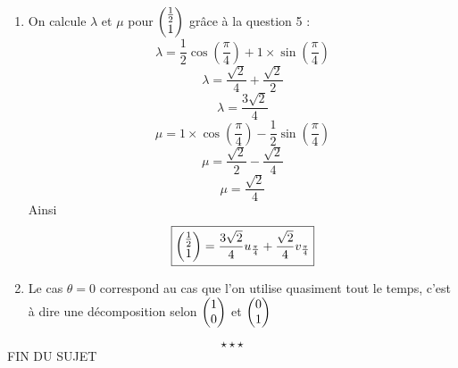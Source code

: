\begin{enumerate}
\item On calcule $\lambda$ et $\mu$ pour $\displaystyle \begin{pmatrix}\frac{1}{2} \\1 \end{pmatrix}$ grâce à la question 5 : 
$$\lambda = \frac{1}{2}\cos(\frac{\pi}{4}) + 1 \times \sin(\frac{\pi}{4})$$
$$\lambda = \frac{\sqrt{2}}{4} + \frac{\sqrt{2}}{2}$$
$$\boxed{\lambda = \frac{3\sqrt{2}}{4}}$$
$$\mu = 1\times \cos(\frac{\pi}{4}) - \frac{1}{2}\sin(\frac{\pi}{4})$$
$$\mu = \frac{\sqrt{2}}{2} - \frac{\sqrt{2}}{4}$$
$$\boxed{\mu = \frac{\sqrt{2}}{4}}$$
Ainsi $$\boxed{\begin{pmatrix}\frac{1}{2} \\1 \end{pmatrix} = \frac{3\sqrt{2}}{4}u_{\frac{\pi}{4}} + \frac{\sqrt{2}}{4}v_{\frac{\pi}{4}}}$$
\item Le cas $\theta =0$ correspond au cas que l'on utilise quasiment tout le temps, c'est à dire une décomposition selon $\begin{pmatrix}1 \\0 \end{pmatrix}$ et $\begin{pmatrix}0 \\1 \end{pmatrix}$
\end{enumerate}
$$\star \star \star$$
\center
FIN DU SUJET
